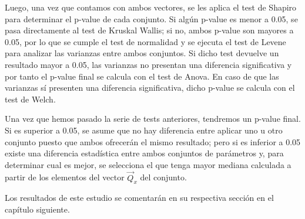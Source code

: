 Luego, una vez que contamos con ambos vectores, se les aplica el test de Shapiro para determinar el p-value de cada conjunto. Si algún p-value es menor a 0.05, se pasa directamente al test de Kruskal Wallis; si no, ambos p-value son mayores a 0.05, por lo que se cumple el test de normalidad y se ejecuta el test de Levene para analizar las varianzas entre ambos conjuntos. Si dicho test devuelve un resultado mayor a 0.05, las varianzas no presentan una diferencia significativa y por tanto el p-value final se calcula con el test de Anova. En caso de que las varianzas sí presenten una diferencia significativa, dicho p-value se calcula con el test de Welch.

Una vez que hemos pasado la serie de tests anteriores, tendremos un p-value final. Si es superior a 0.05, se asume que no hay diferencia entre aplicar uno u otro conjunto puesto que ambos ofrecerán el mismo resultado; pero si es inferior a 0.05 existe una diferencia estadística entre ambos conjuntos de parámetros y, para determinar cual es mejor, se selecciona el que tenga mayor mediana calculada a partir de los elementos del vector $\vec{Q}_x$ del conjunto.

Los resultados de este estudio se comentarán en su respectiva sección en el capítulo siguiente.